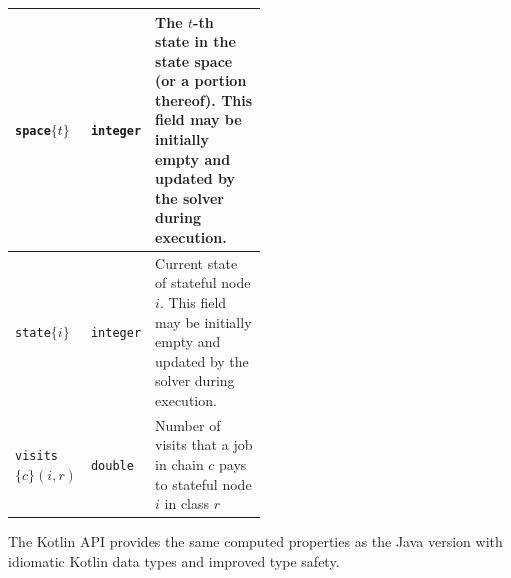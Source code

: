 \begin{MATLAB}
\begin{table}[thbp]
{\begin{tabular}{|l|l|p{0.5\linewidth}|}
\texttt{space}$\{t\}$  & \texttt{integer} & The $t$-th state in the state space (or a portion thereof). This field may be initially empty and updated by the solver during execution.\\\hline
\texttt{state}$\{i\}$ & \texttt{integer} & Current state of stateful node $i$. This field may be initially empty and updated by the solver during execution.\\\hline
\texttt{visits}$\{c\}(i,r)$  & \texttt{double} & Number of visits that a job in chain $c$ pays to stateful node $i$ in class $r$\\\hline
\end{tabular}
}
\label{TAB_QN_COMPUTED}
\end{table}
\end{MATLAB}
\begin{JAVA}
\begin{KOTLIN}
The Kotlin API provides the same computed properties as the Java version with idiomatic Kotlin data types and improved type safety.
\end{KOTLIN}


\end{JAVA}
